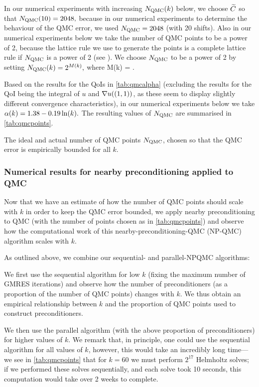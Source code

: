 In our numerical experiments with increasing $N_{\mathrm{QMC}}(k)$ below, we choose $\widetilde{C}$ so that $N_{\mathrm{QMC}}(10) = 2048,$ because in our numerical experiments to determine the behaviour of the QMC error, we used $N_{\mathrm{QMC}} = 2048$ (with 20 shifts). Also in our numerical experiments below we take the number of QMC points to be a power of 2, because the lattice rule we use to generate the points is a complete lattice rule if $N_{\mathrm{QMC}}$ is a power of 2 (see \cite{NuREADME}). We choose $N_{\mathrm{QMC}}$ to be a power of 2 by setting $N_{\mathrm{QMC}}(k) = 2^{M(k)},$ where
\beqs
M(k) = .
\eeqs

Based on the results for the QoIs in \cref{tab:qmcalpha} (excluding the results for the QoI being the integral of $u$ and $\nabla u((1,1))$, as these seem to display slightly different convergence characteristics), in our numerical experiments below we take $\alpha(k) = 1.38 - 0.19  \operatorname{ln}(k).$ The resulting values of $N_{\mathrm{QMC}}$ are summarised in \cref{tab:qmcpoints}.

\begin{table}[h]
  \centering
  
  \caption{The ideal and actual number of QMC points $N_{\mathrm{QMC}}$, chosen so that the QMC error is empirically bounded for all $k$.\label{tab:qmcpoints}}
  \end{table}

\subsubsection{Numerical results for nearby preconditioning applied to QMC}

Now that we have an estimate of how the number of QMC points should scale with $k$ in order to keep the QMC error bounded, we apply nearby preconditioning to QMC (with the number of points chosen as in \cref{tab:qmcpoints}) and observe how the computational work of this nearby-preconditioning-QMC (NP-QMC) algorithm scales with $k.$

As outlined above, we combine our sequential- and parallel-NPQMC algorithms:\label{page:seqandpar}
\bit
\item We first use the sequential algorithm for low $k$ (fixing the maximum number of GMRES iterations) and observe how the number of preconditioners (as a proportion of the number of QMC points) changes with $k$. We thus obtain an empirical relationship between $k$ and the proportion of QMC points used to construct preconditioners.
  \item We then use the parallel algorithm (with the above proportion of preconditioners) for higher values of $k.$
    \eit
    We remark that, in principle, one could use the sequential algorithm for all values of $k$, however, this would take an incredibly long time--- we see in \cref{tab:qmcpoints} that for $k=60$ we must perform $2^{17}$ Helmholtz solves; if we performed these solves sequentially, and each solve took 10 seconds, this computation would take over 2 weeks to complete.

